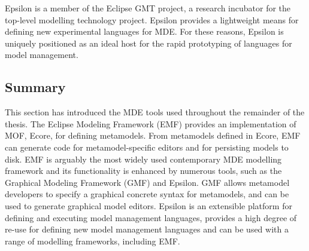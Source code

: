 Epsilon is a member of the Eclipse GMT \cite{gmt} project, a research incubator for the top-level modelling technology project. Epsilon provides a lightweight means for defining new experimental languages for MDE. For these reasons, Epsilon is uniquely positioned as an ideal host for the rapid prototyping of languages for model management.

\subsection{Summary}
This section has introduced the MDE tools used throughout the remainder of the thesis. The Eclipse Modeling Framework (EMF) provides an implementation of MOF, Ecore, for defining metamodels. From metamodels defined in Ecore, EMF can generate code for metamodel-specific editors and for persisting models to disk. EMF is arguably the most widely used contemporary MDE modelling framework and its functionality is enhanced by numerous tools, such as the Graphical Modeling Framework (GMF) and Epsilon. GMF allows metamodel developers to specify a graphical concrete syntax for metamodels, and can be used to generate graphical model editors. Epsilon is an extensible platform for defining and executing model management languages, provides a high degree of re-use for defining new model management languages and can be used with a range of modelling frameworks, including EMF.